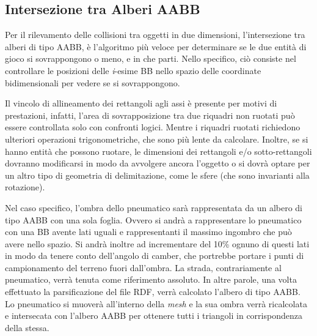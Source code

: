 %
\subsection{Intersezione tra Alberi AABB}

Per il rilevamento delle collisioni tra oggetti in due dimensioni, l'intersezione tra alberi di tipo \ac{AABB}, è l'algoritmo più veloce per determinare se le due entità di gioco si sovrappongono o meno, e in che parti. Nello specifico, ciò consiste nel controllare le posizioni delle \textit{i}-esime \ac{BB} nello spazio delle coordinate bidimensionali per vedere se si sovrappongono.

Il vincolo di allineamento dei rettangoli agli assi è presente per motivi di prestazioni, infatti, l'area di sovrapposizione tra due riquadri non ruotati può essere controllata solo con confronti logici. Mentre i riquadri ruotati richiedono ulteriori operazioni trigonometriche, che sono più lente da calcolare. Inoltre, se si hanno entità che possono ruotare, le dimensioni dei rettangoli e/o sotto-rettangoli dovranno modificarsi in modo da avvolgere ancora l'oggetto o si dovrà optare per un altro tipo di geometria di delimitazione, come le sfere (che sono invarianti alla rotazione).

Nel caso specifico, l'ombra dello pneumatico sarà rappresentata da un albero di tipo \ac{AABB} con una sola foglia. Ovvero si andrà a rappresentare lo pneumatico con una \ac{BB} avente lati uguali e rappresentanti il massimo ingombro che può avere nello spazio. Si andrà inoltre ad incrementare del 10\% ognuno di questi lati in modo da tenere conto dell'angolo di camber, che portrebbe portare i punti di campionamento del terreno fuori dall'ombra. La strada, contrariamente al pneumatico, verrà tenuta come riferimento assoluto. In altre parole, una volta effettuato la parsificazione del file \ac{RDF}, verrà calcolato l'albero di tipo \ac{AABB}. Lo pneumatico si muoverà all'interno della \textit{mesh} e la sua ombra verrà ricalcolata e intersecata con l'albero \ac{AABB} per ottenere tutti i triangoli in corrispondenza della stessa.

